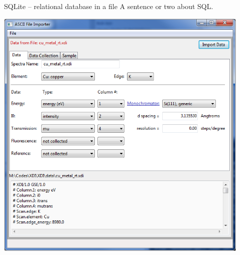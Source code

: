 \documentclass[final]{beamer}
\begin{document}
\begin{frame}{}
\begin{columns}[t]
\begin{column}{.35\linewidth}
\begin{block}{CIF -- Crystallographic Information Framework}
{\begin{minipage}{0.8\linewidth}
\begin{alltt}
                }
              \end{alltt}
              \end{minipage} }
        \end{block}
      \end{column}
      \begin{column}{.01\linewidth}
      \end{column}
      \begin{column}{.31\linewidth}
        \begin{block}{SQLite -- relational database in a file}
          A sentence or two about SQL.

         \vspace{9mm}

         \begin{center}
           \includegraphics[width=0.6\linewidth]{sqlite.png}
         \end{center}
        \end{block}
      \end{column}

    \end{columns}
  \end{frame}
\end{document}
